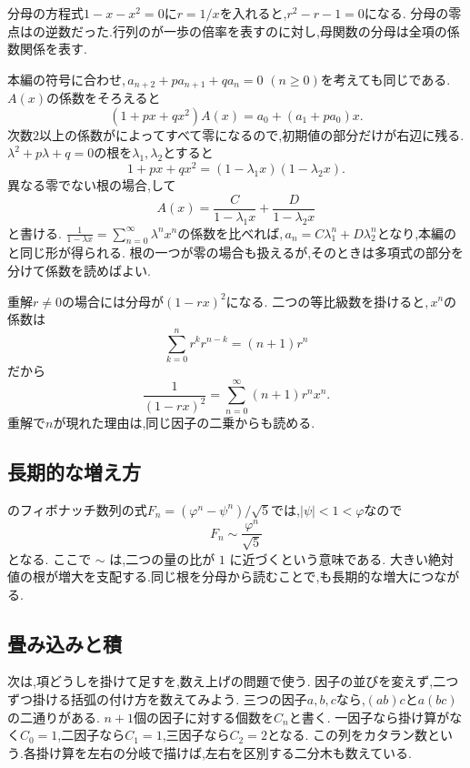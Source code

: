 分母の方程式$1-x-x^2=0$に$r=1/x$を入れると,$r^2-r-1=0$になる.
分母の零点はの逆数だった.行列のが一歩の倍率を表すのに対し,母関数の分母は全項の係数関係を表す.

本編の符号に合わせ,\,$a_{n+2}+pa_{n+1}+qa_n=0$ $(n\ge0)$を考えても同じである.
$A(x)$の係数をそろえると
\[
  (1+px+qx^2)A(x)=a_0+(a_1+pa_0)x.
\]
次数$2$以上の係数がによってすべて零になるので,初期値の部分だけが右辺に残る.
$\lambda^2+p\lambda+q=0$の根を$\lambda_1,\lambda_2$とすると
\[
  1+px+qx^2=(1-\lambda_1x)(1-\lambda_2x).
\]
異なる零でない根の場合,して
\[
  A(x)=\frac{C}{1-\lambda_1x}
       +\frac{D}{1-\lambda_2x}
\]
と書ける.
$\displaystyle \frac{1}{1-\lambda x}=\sum_{n=0}^\infty\lambda^n x^n$の係数を比べれば,\,$a_n=C\lambda_1^n+D\lambda_2^n$となり,本編のと同じ形が得られる.
根の一つが零の場合も扱えるが,そのときは多項式の部分を分けて係数を読めばよい.

重解$r\ne0$の場合には分母が$(1-rx)^2$になる.
二つの等比級数を掛けると,\,$x^n$の係数は
\[
  \sum_{k=0}^n r^k r^{n-k}=(n+1)r^n
\]
だから
\[
  \frac1{(1-rx)^2}
  =\sum_{n=0}^\infty(n+1)r^n x^n.
\]
重解で$n$が現れた理由は,同じ因子の二乗からも読める.

\subsection{長期的な増え方}
のフィボナッチ数列の式$F_n=(\varphi^n-\psi^n)/\sqrt5$では,$|\psi|<1<\varphi$なので
\[
  F_n\sim\frac{\varphi^n}{\sqrt5}
\]
となる.
ここで $\sim$ は,二つの量の比が $1$ に近づくという意味である.
大きい絶対値の根が増大を支配する.同じ根を分母から読むことで,も長期的な増大につながる.

\subsection{畳み込みと積}
次は,項どうしを掛けて足すを,数え上げの問題で使う.
因子の並びを変えず,二つずつ掛ける括弧の付け方を数えてみよう.
三つの因子$a,b,c$なら,$(ab)c$と$a(bc)$の二通りがある.
$n+1$個の因子に対する個数を$C_n$と書く.
一因子なら掛け算がなく$C_0=1$,二因子なら$C_1=1$,三因子なら$C_2=2$となる.
この列をカタラン数という.各掛け算を左右の分岐で描けば,左右を区別する二分木も数えている.

